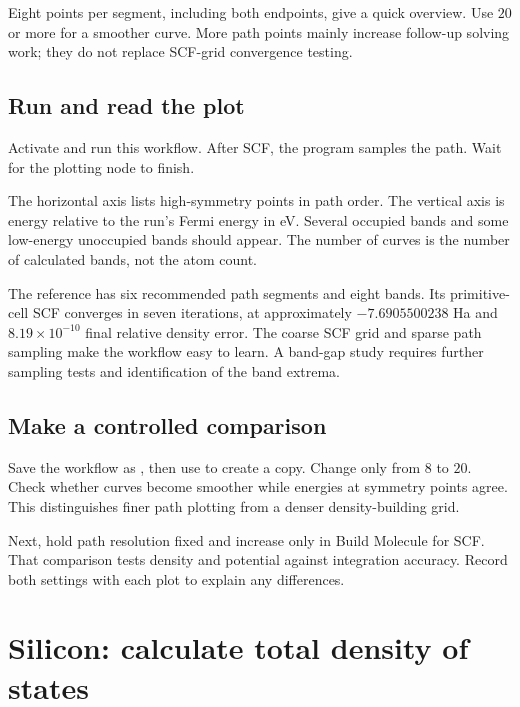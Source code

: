 Eight points per segment, including both endpoints, give a quick overview. Use $20$ or more for a smoother curve. More path points mainly increase follow-up solving work; they do not replace SCF-grid convergence testing.

\subsection{Run and read the plot}

Activate and run this workflow. After SCF, the program samples the path. Wait for the plotting node to finish.

The horizontal axis lists high-symmetry points in path order. The vertical axis is energy relative to the run's Fermi energy in eV. Several occupied bands and some low-energy unoccupied bands should appear. The number of curves is the number of calculated bands, not the atom count.


The reference has six recommended path segments and eight bands. Its primitive-cell SCF converges in seven iterations, at approximately $-7.6905500238$ Ha and $8.19\times10^{-10}$ final relative density error. The coarse SCF grid and sparse path sampling make the workflow easy to learn. A band-gap study requires further sampling tests and identification of the band extrema.

\subsection{Make a controlled comparison}

Save the workflow as , then use  to create a copy. Change only \mbox{} from $8$ to $20$. Check whether curves become smoother while energies at symmetry points agree. This distinguishes finer path plotting from a denser density-building grid.

Next, hold path resolution fixed and increase only \mbox{} in Build Molecule for SCF. That comparison tests density and potential against integration accuracy. Record both settings with each plot to explain any differences.

\section{Silicon: calculate total density of states}

